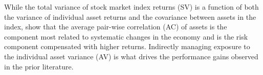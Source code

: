 While the total variance of stock market index returns (SV) is a function of both the variance of individual asset returns and the covariance between assets in the index, \citet{pollet_average_2010} show that the average pair-wise correlation (AC) of assets is the component most related to systematic changes in the economy and is the risk component compensated with higher returns. Indirectly managing exposure to the individual asset variance (AV) is what drives the performance gains observed in the prior literature. 


